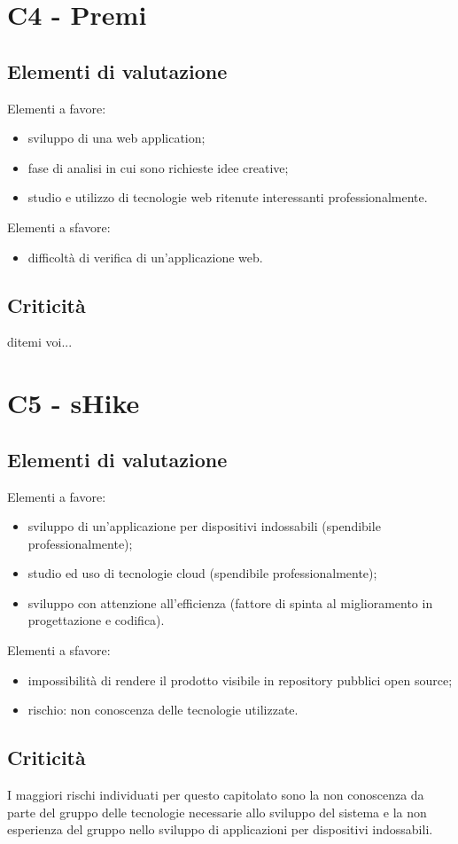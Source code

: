 \section{C4 - Premi}{
	\subsection{Elementi di valutazione}{
		Elementi a favore:
		\begin{itemize}
			\item sviluppo di una web application;
			\item fase di analisi in cui sono richieste idee creative;
			\item studio e utilizzo di tecnologie web ritenute interessanti professionalmente.
		\end{itemize}
		
		Elementi a sfavore:
		\begin{itemize}
			\item difficoltà di verifica di un'applicazione web.
		\end{itemize}
	}
	\subsection{Criticità}{
		ditemi voi...
	}
}
\section{C5 - sHike}{
	\subsection{Elementi di valutazione}{
		Elementi a favore:
		\begin{itemize}
			\item sviluppo di un'applicazione per dispositivi indossabili (spendibile professionalmente);
			\item studio ed uso di tecnologie cloud (spendibile professionalmente);
			\item sviluppo con attenzione all'efficienza (fattore di spinta al miglioramento in progettazione e codifica).
		\end{itemize}
		
		Elementi a sfavore:
		\begin{itemize}
			\item impossibilità di rendere il prodotto visibile in repository pubblici open source;
			\item rischio: non conoscenza delle tecnologie utilizzate.
		\end{itemize}
	}
	\subsection{Criticità}{
		I maggiori rischi individuati per questo capitolato sono la non conoscenza da parte del gruppo delle tecnologie necessarie allo sviluppo del sistema e la non esperienza del gruppo nello sviluppo di applicazioni per dispositivi indossabili. 
	}
}






